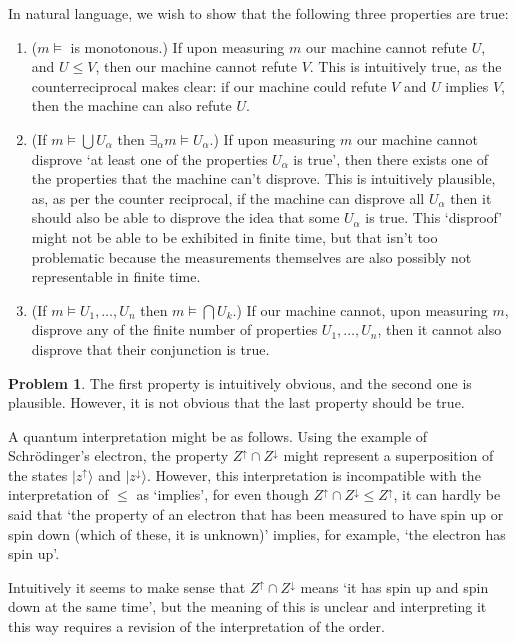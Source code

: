 \documentclass{article}
\theoremstyle{definition}
\newtheorem{problem}{Problem}
\begin{document}
In natural language, we wish to show that the following three properties are true:
\begin{enumerate}
\item ($m\vDash$ is monotonous.) If upon measuring $m$ our machine cannot refute $U$, and $U \leq V$, then our machine cannot refute $V$. This is intuitively true, as the counterreciprocal makes clear: if our machine could refute $V$ and $U$ implies $V$, then the machine can also refute $U$.

\item (If $m\vDash \bigcup U_\alpha$ then $\exists_\alpha m \vDash U_\alpha$.) If upon measuring $m$ our machine cannot disprove `at least one of the properties $U_\alpha$ is true', then there exists one of the properties that the machine can't disprove. This is intuitively plausible, as, as per the counter reciprocal, if the machine can disprove all $U_\alpha$ then it should also be able to disprove the idea that some $U_\alpha$ is true. This `disproof' might not be able to be exhibited in finite time, but that isn't too problematic because the measurements themselves are also possibly not representable in finite time.

\item (If $m\vDash U_1, \dots, U_n$ then $m \vDash \bigcap U_k$.) If our machine cannot, upon measuring $m$, disprove any of the finite number of properties $U_1, \dots, U_n$, then it cannot also disprove that their conjunction is true.
\end{enumerate}

\begin{problem}\label{probhom}
The first property is intuitively obvious, and the second one is plausible. However, it is not obvious that the last property should be true.

A quantum interpretation might be as follows. Using the example of Schrödinger's electron, the property $Z^\uparrow \cap Z^\downarrow$ might represent a superposition of the states $\lvert z^\uparrow \rangle$ and $\lvert z^\downarrow \rangle$. However, this interpretation is incompatible with the interpretation of $\leq$ as `implies', for even though $Z^\uparrow \cap Z^\downarrow \leq Z^\uparrow$, it can hardly be said that `the property of an electron that has been measured to have spin up or spin down (which of these, it is unknown)' implies, for example, `the electron has spin up'. 

Intuitively it seems to make sense that $Z^\uparrow \cap Z^\downarrow$ means `it has spin up and spin down at the same time', but the meaning of this is unclear and interpreting it this way requires a revision of the interpretation of the order.
\end{problem}
\end{document}
